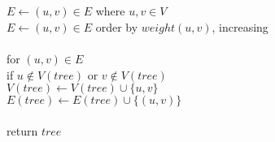 \documentclass[11pt]{article}
\begin{document}
\begin{itemize}
\begin{algo}
	\+
\\[0.5ex]
\\		$E \gets (u,v) \in E$ where $u,v \in V$	
\\		$E \gets (u,v) \in E$ order by $weight(u,v)$, increasing
\\
\\		for $(u,v) \in E$\+
\\			if $u \notin V(tree)$ or $v \notin V(tree)$\+
\\				$V(tree) \gets V(tree) \cup \{u,v\}$
\\				$E(tree) \gets E(tree) \cup \{(u,v)\}$\- \- 
\\		
\\		return $tree$
\\[0.5ex]
\end{algo}
\end{itemize}
\end{document}
